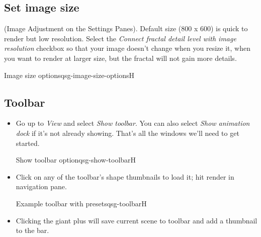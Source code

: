 \subsection{Set image size}\label{qsg-image-size} 

(Image Adjustment on the Settings Panes). Default size (800 x 600) is quick to render but low resolution. Select the \emph{Connect fractal detail level with image resolution} checkbox so that your image doesn’t change when you resize it, when you want to render at larger size, but the fractal will not gain more details. 

{Image size options}{qsg-image-size-options}{H}

\subsection{Toolbar}\label{qsg-toolbar}


\begin{itemize}
	\item Go up to \emph{View} and select \emph{Show toolbar}. You can also select \emph{Show animation dock} if it’s not already showing. That’s all the windows we’ll need to get started.
	
	{Show toolbar option}{qsg-show-toolbar}{H}
	
    \item Click on any of the toolbar’s shape thumbnails to load it; hit render in navigation pane.
    
    {Example toolbar with presets}{qsg-toolbar}{H}
    
    \item Clicking the giant plus will save current scene to toolbar and add a thumbnail to the bar. 
\end{itemize}

